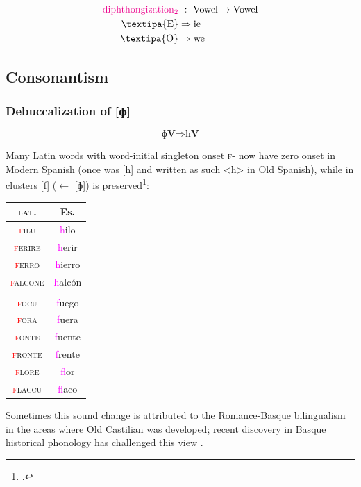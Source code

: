 \documentclass{report}[12pt]
\begin{document}
\begin{tcolorbox}
  \begin{align*}
    \text{\textcolor{magenta}{diphthongization$_2$}} &\ :\ \text{Vowel} \rightarrow \text{Vowel} \\
    \text{\textipa{E}} & \Rightarrow \text{ie} \\
    \text{\textipa{O}} & \Rightarrow \text{we} \\
  \end{align*}
\end{tcolorbox}

\subsection{Consonantism}

\subsubsection{Debuccalization of [ɸ]}

\begin{tcolorbox}
  \[ \text{ɸ}\textbf{V} \Rightarrow \text{h}\textbf{V} \]
\end{tcolorbox}

Many Latin words with word-initial singleton onset \textsc{f}- now have zero onset in Modern Spanish (once was [h] and written as such <h> in Old Spanish), while in clusters [f] ($\leftarrow$ [ɸ]) is preserved\footcite[p.~50]{romance_his}:
\begin{center}
  \begin{tabular}{c c}
    \textsc{lat.} & Es. \\
    \hline
    \textsc{\textcolor{red}{f}ilu} & \textcolor{magenta}{h}ilo \\
    \textsc{\textcolor{red}{f}erire} & \textcolor{magenta}{h}erir \\
    \textsc{\textcolor{red}{f}erro} & \textcolor{magenta}{h}ierro \\
    \textsc{\textcolor{red}{f}alcone} & \textcolor{magenta}{h}alcón \\
                  & \\
    \textsc{\textcolor{red}{f}ocu} & \textcolor{magenta}{f}uego \\
    \textsc{\textcolor{red}{f}ora} & \textcolor{magenta}{f}uera \\
    \textsc{\textcolor{red}{f}onte} & \textcolor{magenta}{f}uente \\
    \textsc{\textcolor{red}{f}ronte} & \textcolor{magenta}{f}rente \\
    \textsc{\textcolor{red}{f}lore} & \textcolor{magenta}{f}lor \\
    \textsc{\textcolor{red}{f}laccu} & \textcolor{magenta}{f}laco \\
  \end{tabular}
\end{center}
Sometimes this sound change is attributed to the Romance-Basque bilingualism in the areas where Old Castilian was developed; recent discovery in Basque historical phonology has challenged this view \parencite{manterola_hualde}.
\end{document}
